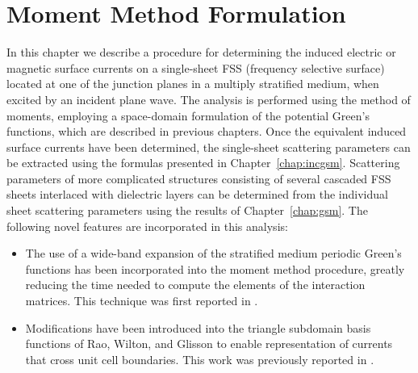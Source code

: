 \chapter{Moment Method Formulation}
\label{chap:mom}
In this chapter we describe a procedure for determining
the induced electric or magnetic surface currents on a single-sheet FSS
(frequency selective surface) located at one of the junction planes in
a multiply stratified medium, when excited by an incident plane wave.  
The analysis is performed using the method of moments, employing
a space-domain formulation of the potential Green's functions, 
which are  described in previous chapters.
Once the equivalent induced
surface currents have been determined, the single-sheet scattering
parameters can be extracted using the formulas presented in
Chapter~\ref{chap:incgsm}.  Scattering parameters of more complicated structures
consisting of several cascaded FSS sheets interlaced with dielectric
layers can be determined from the individual sheet scattering parameters using
the results of Chapter~\ref{chap:gsm}.
%
The following novel features are incorporated in this analysis:
\begin{itemize}
\item The use of a wide-band expansion of the stratified medium
  periodic Green's functions has been incorporated into the moment
  method procedure, greatly reducing the time needed to compute the
  elements of the interaction matrices.  This technique was first
  reported in \cite{simo:01b}.
\item Modifications have been introduced into the triangle subdomain
  basis functions  of Rao, Wilton, and Glisson \cite{rawg:82} to
  enable representation of currents that cross unit cell boundaries.
  This work was previously reported in \cite{simo:02c}.
\end{itemize}
%
%
